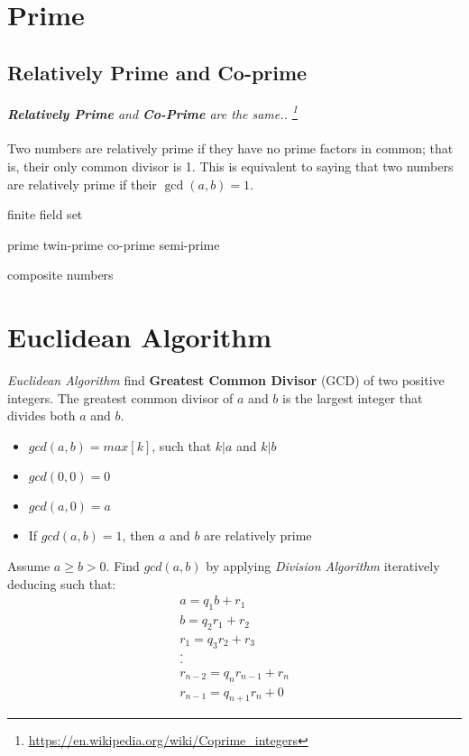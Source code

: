 \documentclass[a4paper]{article}
\begin{document}
\section{Prime}

\subsection{Relatively Prime and Co-prime}

\textit{\textbf{Relatively Prime} and \textbf{Co-Prime} are the same.. \footnote{\url{https://en.wikipedia.org/wiki/Coprime_integers}} }
\\
\\
Two numbers are relatively prime if they have no prime factors in common; that is, their only common divisor is 1. This is equivalent to saying that two numbers are relatively prime if their $\gcd(a, b) = 1$.



finite field
set


prime
twin-prime
co-prime
semi-prime

composite numbers


\section{Euclidean Algorithm}

\textit{Euclidean Algorithm} find \textbf{Greatest Common Divisor} (GCD) of two positive integers. The greatest common divisor of $a$ and $b$ is the largest integer that divides both $a$ and $b$.

\begin{itemize}
\item $gcd(a, b) = max[k]$, such that $k|a$ and $k|b$
\item $gcd(0, 0) = 0$
\item $gcd(a, 0) = a$
\item If $gcd(a, b) = 1$, then $a$ and $b$ are relatively prime
\end{itemize}

Assume $a \geq b > 0$. Find $gcd(a, b)$ by applying \textit{Division Algorithm} iteratively deducing such that:
\begin{align*}
a = q_1 b + r_1 \\
b = q_2 r_1 + r_2 \\
r_1 = q_3 r_2 + r_3 \\
. \\
. \\
r_{n-2} = q_n r_{n-1} + r_n \\
r_{n-1} = q_{n+1} r_n + 0
\end{align*}
\end{document}
